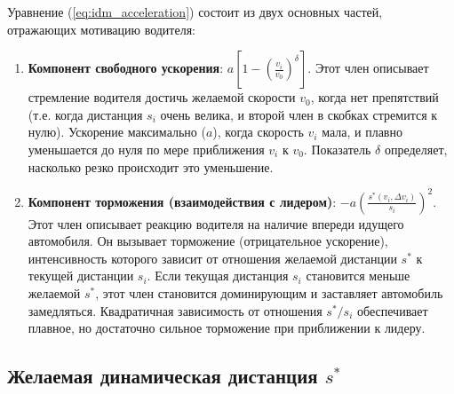 \documentclass[12pt, a4paper]{article}
\begin{document}
Уравнение (\ref{eq:idm_acceleration}) состоит из двух основных частей, отражающих мотивацию водителя:
\begin{enumerate}
    \item \textbf{Компонент свободного ускорения}: $a \left[1 - \left(\frac{v_i}{v_0}\right)^\delta\right]$. Этот член описывает стремление водителя достичь желаемой скорости $v_0$, когда нет препятствий (т.е. когда дистанция $s_i$ очень велика, и второй член в скобках стремится к нулю). Ускорение максимально ($a$), когда скорость $v_i$ мала, и плавно уменьшается до нуля по мере приближения $v_i$ к $v_0$. Показатель $\delta$ определяет, насколько резко происходит это уменьшение.
    \item \textbf{Компонент торможения (взаимодействия с лидером)}: $-a \left( \frac{s^*(v_i, \Delta v_i)}{s_i} \right)^2$. Этот член описывает реакцию водителя на наличие впереди идущего автомобиля. Он вызывает торможение (отрицательное ускорение), интенсивность которого зависит от отношения желаемой дистанции $s^*$ к текущей дистанции $s_i$. Если текущая дистанция $s_i$ становится меньше желаемой $s^*$, этот член становится доминирующим и заставляет автомобиль замедляться. Квадратичная зависимость от отношения $s^*/s_i$ обеспечивает плавное, но достаточно сильное торможение при приближении к лидеру.
\end{enumerate}


\subsection{Желаемая динамическая дистанция $s^*$}
\label{subsec:s_star}
\end{document}
